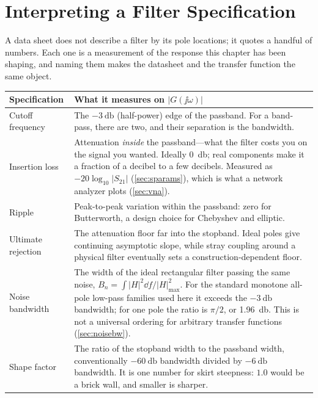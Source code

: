 \section{Interpreting a Filter Specification}
\label{sec:filterspecs}
A data sheet does not describe a filter by its pole locations; it quotes a handful of
numbers. Each one is a measurement of the response this chapter has been shaping, and
naming them makes the datasheet and the transfer function the same object.

\begin{center}
\begin{tabularx}{\textwidth}{@{}L{0.24\textwidth}Y@{}}
\toprule
Specification & What it measures on \(|G(\jj\omega)|\) \\
\midrule
Cutoff frequency & The \(-\SI{3}{\decibel}\) (half-power) edge of the passband. For a band-pass, there are two, and their separation is the bandwidth. \\
Insertion loss & Attenuation \emph{inside} the passband---what the filter costs you on the signal you wanted. Ideally \SI{0}{\decibel}; real components make it a fraction of a decibel to a few decibels. Measured as \(-20\log_{10}|S_{21}|\) (\cref{sec:sparams}), which is what a network analyzer plots (\cref{sec:vna}). \\
Ripple & Peak-to-peak variation within the passband: zero for Butterworth, a design choice for Chebyshev and elliptic. \\
Ultimate rejection & The attenuation floor far into the stopband. Ideal poles give continuing asymptotic slope, while stray coupling around a physical filter eventually sets a construction-dependent floor. \\
Noise bandwidth & The width of the ideal rectangular filter passing the same noise, \(B_n=\int|H|^2\dd f/|H|^2_{\max}\). For the standard monotone all-pole low-pass families used here it exceeds the \(-\SI{3}{\decibel}\) bandwidth; for one pole the ratio is \(\pi/2\), or \SI{1.96}{\decibel}. This is not a universal ordering for arbitrary transfer functions (\cref{sec:noisebw}). \\
Shape factor & The ratio of the stopband width to the passband width, conventionally \(\SI{-60}{\decibel}\) bandwidth divided by \(\SI{-6}{\decibel}\) bandwidth. It is one number for skirt steepness: \(1.0\) would be a brick wall, and smaller is sharper. \\
\bottomrule
\end{tabularx}
\end{center}


